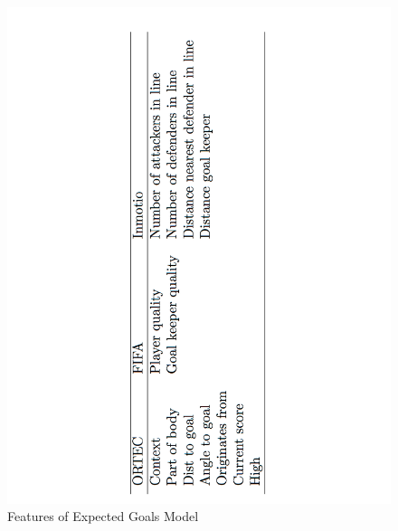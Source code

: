 \documentclass[sigconf]{acmart}
\begin{document}
\begin{figure}
\centering
\includegraphics[scale=.2]{images/features.pdf}
\caption{Features of Expected Goals Model}
\label{fig:Features of Expected Goals Model}
\end{figure}
\end{document}
